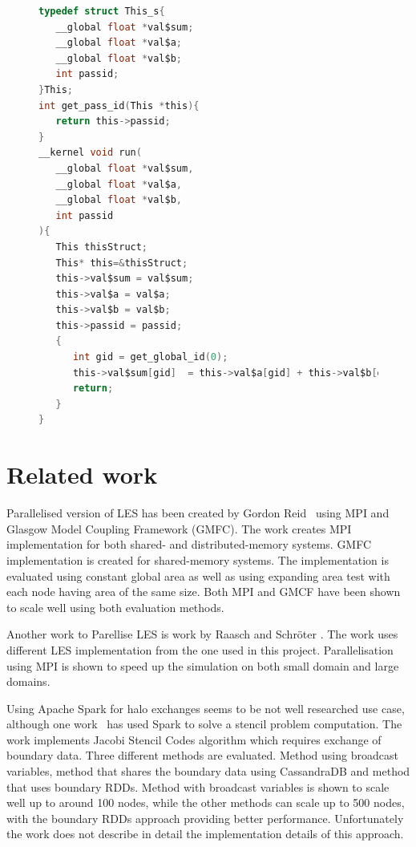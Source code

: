 \documentclass{l4proj}
\begin{document}
\begin{figure}
  \begin{lstlisting}[language=C]
typedef struct This_s{
   __global float *val$sum;
   __global float *val$a;
   __global float *val$b;
   int passid;
}This;
int get_pass_id(This *this){
   return this->passid;
}
__kernel void run(
   __global float *val$sum, 
   __global float *val$a, 
   __global float *val$b, 
   int passid
){
   This thisStruct;
   This* this=&thisStruct;
   this->val$sum = val$sum;
   this->val$a = val$a;
   this->val$b = val$b;
   this->passid = passid;
   {
      int gid = get_global_id(0);
      this->val$sum[gid]  = this->val$a[gid] + this->val$b[gid];
      return;
   }
}   
  \end{lstlisting}
\end{figure}

\section{Related work}

Parallelised version of LES has been created by Gordon Reid~\cite{les_mpi} using MPI
and Glasgow Model Coupling Framework (GMFC). The work creates MPI implementation for both shared-
and distributed-memory systems. GMFC implementation is created for shared-memory systems.
The implementation is evaluated using constant global area as well as using expanding area
test with each node having area of the same size. Both MPI and GMCF have been shown
to scale well using both evaluation methods.

Another work to Parellise LES is work by Raasch and Schröter \cite{les_palm}. The work
uses different LES implementation from the one used in this project. Parallelisation
using MPI is shown to speed up the simulation on both small domain and large domains.

Using Apache Spark for halo exchanges seems to be not well researched use case, although
one work~\cite{seismic_spark} has used Spark to solve a stencil problem computation. 
The work implements Jacobi Stencil Codes algorithm which requires exchange of boundary
data. Three different methods are evaluated. Method using broadcast variables, method
that shares the boundary data using CassandraDB and method that uses boundary RDDs.
Method with broadcast variables is shown to scale well up to around 100 nodes, while
the other methods can scale up to 500 nodes, with the boundary RDDs approach providing
better performance. Unfortunately the work does not describe in detail the implementation
details of this approach.
\end{document}
